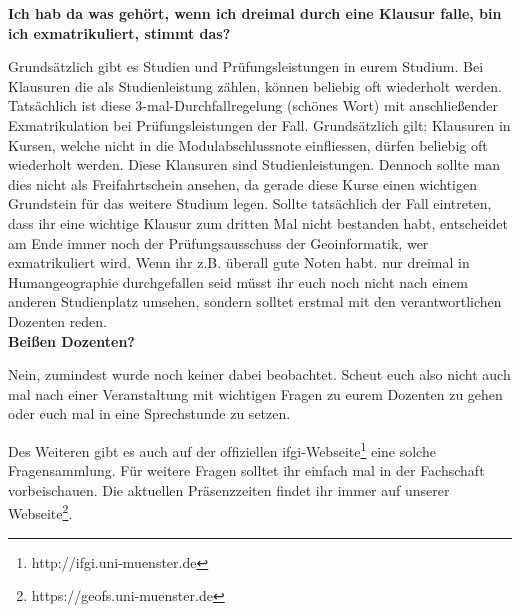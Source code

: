 \textbf{Ich hab da was gehört, wenn ich dreimal durch eine Klausur falle, bin ich exmatrikuliert, stimmt das?}

Grundsätzlich gibt es Studien und Prüfungsleistungen in eurem Studium. Bei Klausuren die als Studienleistung zählen, können beliebig oft wiederholt werden. Tatsächlich ist diese 3-mal-Durchfallregelung (schönes Wort) mit anschließender Exmatrikulation bei Prüfungsleistungen der Fall. Grundsätzlich gilt: Klausuren in Kursen, welche nicht in die Modulabschlussnote einfliessen, dürfen beliebig oft wiederholt werden. Diese Klausuren sind Studienleistungen. Dennoch sollte man dies nicht als Freifahrtschein ansehen, da gerade diese Kurse einen wichtigen Grundstein für das weitere Studium legen.
Sollte tatsächlich der Fall eintreten, dass ihr eine wichtige Klausur zum dritten Mal nicht bestanden habt, entscheidet am Ende immer noch der Prüfungsausschuss der Geoinformatik, wer exmatrikuliert wird. Wenn ihr z.B. überall gute Noten habt. nur dreimal in Humangeographie durchgefallen seid müsst ihr euch noch nicht nach einem anderen Studienplatz umsehen, sondern solltet erstmal mit den verantwortlichen Dozenten reden.\\

\textbf{Beißen Dozenten?}

Nein, zumindest wurde noch keiner dabei beobachtet. Scheut euch also nicht auch mal nach einer Veranstaltung mit wichtigen Fragen zu eurem Dozenten zu gehen oder euch mal in eine Sprechstunde zu setzen.

Des Weiteren gibt es auch auf der ofﬁziellen ifgi-Webseite\footnote{http://ifgi.uni-muenster.de} eine solche Fragensammlung. Für weitere Fragen solltet ihr einfach mal in der Fachschaft vorbeischauen. Die aktuellen Präsenzzeiten ﬁndet ihr immer auf unserer Webseite\footnote{https://geofs.uni-muenster.de}.

